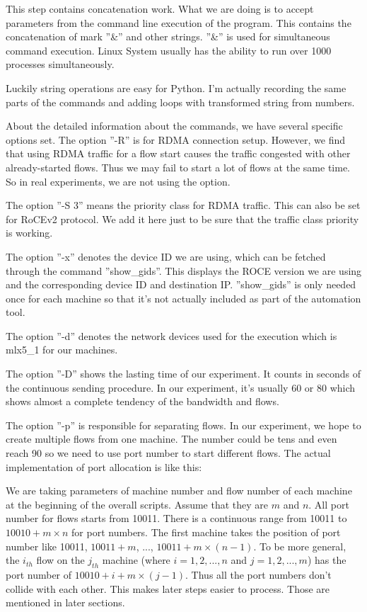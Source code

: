 \documentclass[12pt,a4paper]{article}
\begin{document}
This step contains concatenation work.
What we are doing is to accept parameters from the command line execution of the program.
This contains the concatenation of mark ''\&'' and other strings.
''\&'' is used for simultaneous command execution. Linux System usually has the ability to run over 1000 processes simultaneously.

Luckily string operations are easy for Python.
I'm actually recording the same parts of the commands and adding loops with transformed string from numbers.

About the detailed information about the commands, we have several specific options set.
The option ''-R'' is for RDMA connection setup. However, we find that using RDMA traffic for a flow start causes
the traffic congested with other already-started flows. Thus we may fail to start a lot of flows at the same time.
So in real experiments, we are not using the option.

The option ''-S 3'' means the priority class for RDMA traffic. This can also be set for RoCEv2 protocol.
We add it here just to be sure that the traffic class priority is working.

The option ''-x'' denotes the device ID we are using, which can be fetched through the command ''show\_gids''.
This displays the ROCE version we are using and the corresponding device ID and destination IP.
''show\_gids'' is only needed once for each machine so that it's not actually included as part of the automation tool.

The option ''-d'' denotes the network devices used for the execution which is mlx5\_1 for our machines.

The option ''-D'' shows the lasting time of our experiment. It counts in seconds of the continuous sending procedure.
In our experiment, it's usually 60 or 80 which shows almost a complete tendency of the bandwidth and flows.

The option ''-p'' is responsible for separating flows. In our experiment, we hope to create multiple flows from one machine.
The number could be tens and even reach 90 so we need to use port number to start different flows.
The actual implementation of port allocation is like this: 

We are taking parameters of machine number and flow number of each machine at the beginning of the overall scripts.
Assume that they are $m$ and $n$.
All port number for flows starts from 10011. There is a continuous range from 10011 to $10010+m\times n$ for port numbers.
The first machine takes the position of port number like 10011, $10011+m$, ..., $10011+m\times(n-1)$.
To be more general, the $i_{th}$ flow on the $j_{th}$ machine (where $i=1,2,...,n$ and $j=1,2,...,m$) has the port number of
$10010+i+m\times(j-1)$.
Thus all the port numbers don't collide with each other. This makes later steps easier to process.
Those are mentioned in later sections.
\end{document}
